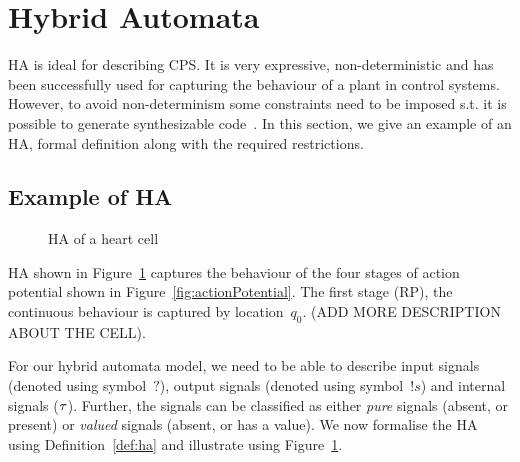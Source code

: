 \section{Hybrid Automata}
\label{sec:HA}



\acf{HA} is ideal for describing 
\ac{CPS}. It is very expressive, non-deterministic  
and has been successfully used for 
capturing the behaviour of a plant in control systems.
However, to avoid non-determinism 
some constraints need to be imposed s.t. it is possible to  
generate synthesizable code~\cite{Lee2014}. 
In this section, we give an example of an \ac{HA}, formal definition  along with the required restrictions.




\subsection{Example of \acf{HA} }

\begin{figure}
\centering

\caption{\acf{HA} of a heart cell \label{fig:heartCellHA}}
\end{figure}

HA shown in Figure~\ref{fig:heartCellHA} captures the 
behaviour of the four stages of action potential  shown in Figure~\ref{fig:actionPotential}.
The first stage (\ac{RP}), the continuous behaviour is captured 
by location~$q_0$. (ADD MORE DESCRIPTION ABOUT THE CELL).

For our hybrid automata model, we need to be able to 
describe  input signals (denoted using symbol~$?$), 
output signals (denoted using symbol~$!s$) 
and internal signals ($\tau$). 
Further,
the signals can be classified as either 
\emph{pure} signals (absent, or present) or
\emph{valued} signals (absent, or has a value).
We now formalise
the \ac{HA} using Definition~\ref{def:ha} 
and illustrate using Figure~\ref{fig:heartCellHA}.\newline



